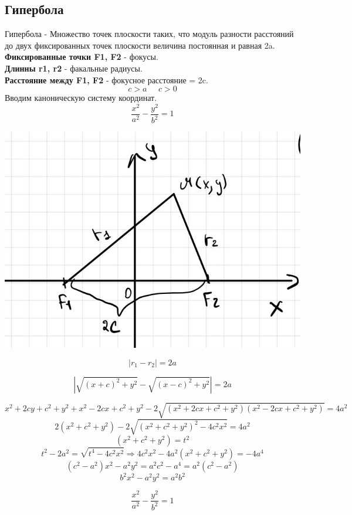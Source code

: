 \documentclass[12pt, paper]{article}
\begin{document}
\subsection{Гипербола}
\setcounter{equation}{0}
Гипербола - Множество точек плоскости таких, что модуль разности расстояний до двух фиксированных точек плоскости величина постоянная и равная 2a.\\
\textbf{Фиксированные точки F1, F2} - фокусы.\\
\textbf{Длинны r1, r2} - факальные радиусы.\\
\textbf{Расстояние между F1, F2} - фокусное расстояние = 2c.
\[c > a \;\;\;\;\; c > 0\]
Вводим каноническую систему координат.\\
\[ \frac{x^2}{a^2} - \frac{y^2}{b^2} = 1 \]
\begin{center}
	\includegraphics[width=0.5\linewidth]{images/Прямые 2 порядка/Гипербола/Гипербола.jpg}\\
\end{center}

\begin{equation}
	|r_1 - r_2| = 2a
\end{equation}

\begin{equation}
	|\sqrt{(x+c)^2+y^2} - \sqrt{(x - c)^2 + y^2}| = 2a
\end{equation}

\[x^2 + 2cy + c^2 + y^2 + x^2 - 2cx + c^2 + y^2 - 2\sqrt{(x^2 + 2cx + c^2 + y^2)(x^2 - 2cx + c^2 + y^2)} = 4a^2\]
\[ 2(x^2 + c^2 + y^2) - 2\sqrt{(x^2 + c^2 + y^2)^2 - 4c^2x^2} = 4a^2\]
\[ (x^2 + c^2 + y^2) = t^2\]
\[ t^2 - 2a^2 = \sqrt{t^4 - 4c^2x^2} \Rightarrow 4c^2x^2 - 4a^2(x^2 + c^2 + y^2) = -4a^4\]
\[ (c^2 - a^2)x^2 - a^2y^2 = a^2c^2 - a^4 = a^2(c^2-a^2) \]
\[ b^2x^2 - a^2y^2 = a^2b^2 \]
\begin{tcolorbox}
\begin{equation}
	\frac{x^2}{a^2} - \frac{y^2}{b^2} = 1
\end{equation}
\end{tcolorbox}
\end{document}
